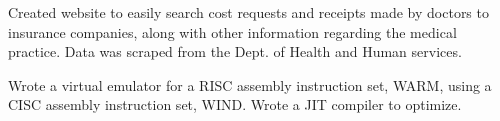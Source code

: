 \documentclass[]{deedy-resume-openfont}
\begin{document}
\begin{minipage}[t]{0.66\textwidth}
\begin{tightemize}
\item Created website to easily search cost requests and receipts made by doctors to insurance companies, along with other information regarding the medical practice. Data was scraped from the Dept. of Health and Human services.
\end{tightemize}
\sectionsep

\begin{tightemize}
\item Wrote a virtual emulator for a RISC assembly instruction set, WARM, using a CISC assembly instruction set, WIND. Wrote a JIT compiler to optimize.
\end{tightemize}


\end{minipage} 
\end{document}
